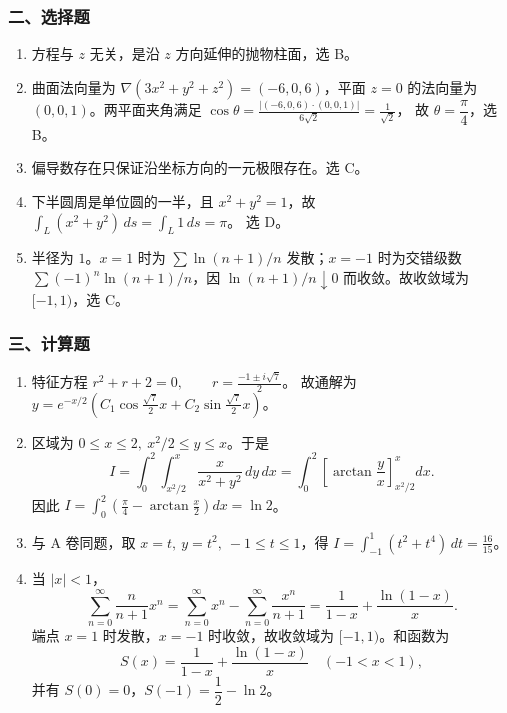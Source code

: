 \subsubsection*{二、选择题}
\begin{enumerate}
  \item 方程与 $z$ 无关，是沿 $z$ 方向延伸的抛物柱面，选 B。
  \item 曲面法向量为 $\nabla(3x^2+y^2+z^2)=(-6,0,6)$，平面 $z=0$ 的法向量为 $(0,0,1)$。两平面夹角满足
  \(\displaystyle \cos\theta=\frac{|(-6,0,6)\cdot(0,0,1)|}{6\sqrt2}=\frac1{\sqrt2}\)，
  故 $\theta=\dfrac{\pi}{4}$，选 B。
  \item 偏导数存在只保证沿坐标方向的一元极限存在。选 C。
  \item 下半圆周是单位圆的一半，且 $x^2+y^2=1$，故 \(\displaystyle \int_L(x^2+y^2)\,ds=\int_L1\,ds=\pi\)。
  选 D。
  \item 半径为 $1$。$x=1$ 时为 $\sum\ln(n+1)/n$ 发散；$x=-1$ 时为交错级数 $\sum(-1)^n\ln(n+1)/n$，因 $\ln(n+1)/n\downarrow0$ 而收敛。故收敛域为 $[-1,1)$，选 C。
\end{enumerate}

\subsubsection*{三、计算题}
\begin{enumerate}
  \item 特征方程 \(\displaystyle r^2+r+2=0,\qquad r=\frac{-1\pm i\sqrt7}{2}\)。
  故通解为
  \(\displaystyle y=e^{-x/2}\left(C_1\cos\frac{\sqrt7}{2}x+C_2\sin\frac{\sqrt7}{2}x\right)\)。
  \item 区域为 $0\le x\le2,\ x^2/2\le y\le x$。于是
  \[
  I=\int_0^2\int_{x^2/2}^{x}\frac{x}{x^2+y^2}\,dy\,dx
  =\int_0^2\left[\arctan\frac{y}{x}\right]_{x^2/2}^{x}dx.
  \]
  因此 \(\displaystyle I=\int_0^2\left(\frac{\pi}{4}-\arctan\frac{x}{2}\right)dx
  =\ln2\)。
  \item 与 A 卷同题，取 $x=t,\ y=t^2,\ -1\le t\le1$，得
  \(\displaystyle I=\int_{-1}^{1}(t^2+t^4)\,dt=\frac{16}{15}\)。
  \item 当 $|x|<1$，
  \[
  \sum_{n=0}^{\infty}\frac{n}{n+1}x^n
  =\sum_{n=0}^{\infty}x^n-\sum_{n=0}^{\infty}\frac{x^n}{n+1}
  =\frac1{1-x}+\frac{\ln(1-x)}{x}.
  \]
  端点 $x=1$ 时发散，$x=-1$ 时收敛，故收敛域为 $[-1,1)$。和函数为
  \[
  S(x)=\frac1{1-x}+\frac{\ln(1-x)}{x}\quad(-1<x<1),
  \]
  并有 $S(0)=0$，$S(-1)=\dfrac12-\ln2$。
\end{enumerate}

